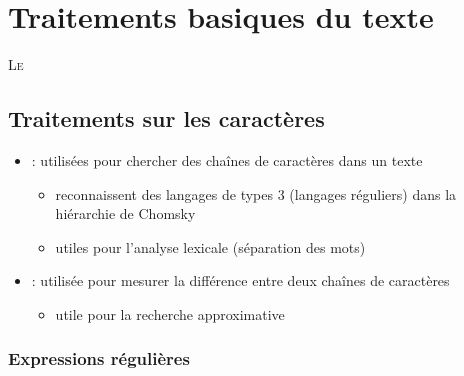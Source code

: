 \documentclass{KodeBook}
\begin{document}
		\mainmatter
	
\fi
\chapter{Traitements basiques du texte}

\begin{introduction}
	\lettrine{L}{e} 
\end{introduction} 


\section{Traitements sur les caractères}

\begin{itemize}
	\item {} : utilisées pour chercher des chaînes de caractères dans un texte
	\begin{itemize}
		\item reconnaissent des langages de types 3 (langages réguliers) dans la hiérarchie de Chomsky 
		\item utiles pour l'analyse lexicale (séparation des mots)
	\end{itemize}
	\item {} : utilisée pour mesurer la différence entre deux chaînes de caractères 
	\begin{itemize}
		\item utile pour la recherche approximative
	\end{itemize}
\end{itemize}

\subsection{Expressions régulières}
\end{document}
